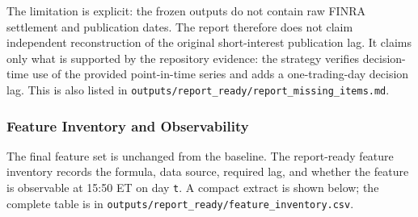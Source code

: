 \documentclass[
]{article}
\begin{document}
The limitation is explicit: the frozen outputs do not contain raw FINRA
settlement and publication dates. The report therefore does not claim
independent reconstruction of the original short-interest publication
lag. It claims only what is supported by the repository evidence: the
strategy verifies decision-time use of the provided point-in-time series
and adds a one-trading-day decision lag. This is also listed in
\texttt{outputs/report\_ready/report\_missing\_items.md}.

\hypertarget{feature-inventory-and-observability}{%
\subsubsection{Feature Inventory and
Observability}\label{feature-inventory-and-observability}}

The final feature set is unchanged from the baseline. The report-ready
feature inventory records the formula, data source, required lag, and
whether the feature is observable at 15:50 ET on day \texttt{t}. A
compact extract is shown below; the complete table is in
\texttt{outputs/report\_ready/feature\_inventory.csv}.
\end{document}
